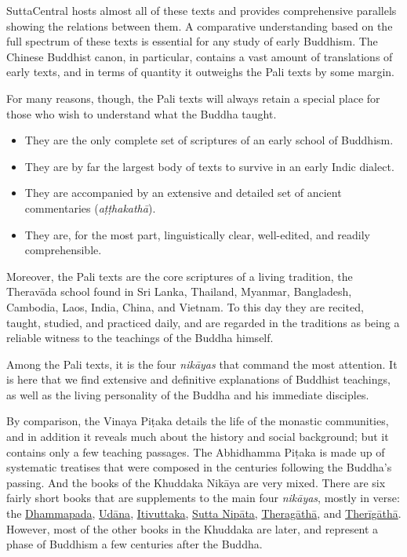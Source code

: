 \documentclass[12pt,openany]{book}%
\begin{document}
SuttaCentral hosts almost all of these texts and provides comprehensive parallels showing the relations between them. A comparative understanding based on the full spectrum of these texts is essential for any study of early Buddhism. The Chinese Buddhist canon, in particular, contains a vast amount of translations of early texts, and in terms of quantity it outweighs the Pali texts by some margin.

For many reasons, though, the Pali texts will always retain a special place for those who wish to understand what the Buddha taught.

\begin{itemize}%
\item They are the only complete set of scriptures of an early school of Buddhism.%
\item They are by far the largest body of texts to survive in an early Indic dialect.%
\item They are accompanied by an extensive and detailed set of ancient commentaries (\textit{\textsanskrit{aṭṭhakathā}}).%
\item They are, for the most part, linguistically clear, well-edited, and readily comprehensible.%
\end{itemize}

Moreover, the Pali texts are the core scriptures of a living tradition, the \textsanskrit{Theravāda} school found in Sri Lanka, Thailand, Myanmar, Bangladesh, Cambodia, Laos, India, China, and Vietnam. To this day they are recited, taught, studied, and practiced daily, and are regarded in the traditions as being a reliable witness to the teachings of the Buddha himself.

Among the Pali texts, it is the four \textit{\textsanskrit{nikāyas}} that command the most attention. It is here that we find extensive and definitive explanations of Buddhist teachings, as well as the living personality of the Buddha and his immediate disciples.

By comparison, the Vinaya \textsanskrit{Piṭaka} details the life of the monastic communities, and in addition it reveals much about the history and social background; but it contains only a few teaching passages. The Abhidhamma \textsanskrit{Piṭaka} is made up of systematic treatises that were composed in the centuries following the Buddha’s passing. And the books of the Khuddaka \textsanskrit{Nikāya} are very mixed. There are six fairly short books that are supplements to the main four \textit{\textsanskrit{nikāyas}}, mostly in verse: the \href{https://suttacentral.net/dhp}{Dhammapada}, \href{https://suttacentral.net/ud}{Udāna}, \href{https://suttacentral.net/iti}{Itivuttaka}, \href{https://suttacentral.net/snp}{Sutta Nipāta}, \href{https://suttacentral.net/thag}{Theragāthā}, and \href{https://suttacentral.net/thig}{Therīgāthā}. However, most of the other books in the Khuddaka are later, and represent a phase of Buddhism a few centuries after the Buddha.
\end{document}
